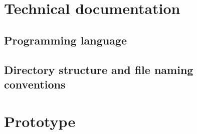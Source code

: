 \documentclass{article}
\begin{document}
\section{Technical documentation}

\subsection{Programming language}



\subsection{Directory structure and file naming conventions}



\section{Prototype}




\end{document}
